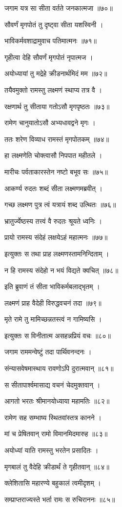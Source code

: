 जगाम यत्र सा सीता वर्तते जनकात्मजा ॥७०॥

सौवर्णं मृगपोतं तु दृष्ट्वा सीता यशस्विनी ।

भाविकर्मवशाद्रामुवाच पतिमात्मनः ॥७१॥

गृहीत्वा देहि सौवर्णं मृगपोतं नृपात्मज ।

अयोध्यायां तु मद्रेहे क्रीडनार्थमिदं मम ॥७२॥

तयैवमुक्तो रामस्तु लक्ष्मणं स्थाप्य तत्र वै ।

रक्षणार्थ तु सीताया गतोऽसौ मृगपृष्ठतः ॥७३॥

रामेण चानुयातोऽसौ अभ्यधावद्वने मृगः ।

ततः शरेण विव्याध रामस्तं मृगपोतकम् ॥७४॥

हा लक्ष्मणेति चोक्त्वासौ निपपात महीतले ।

मारीचः पर्वताकारस्तेन नष्टो बभूव सः ॥७५॥

आकर्ण्य रुदतः शब्दं सीता लक्ष्मणमब्रवीत् ।

गच्छ लक्ष्मण पुत्र त्वं यत्रायं शब्द उत्थितः ॥७६॥

भ्रातुर्ज्येष्ठस्य तत्त्वं वै रुदतः श्रूयते ध्वनिः ।

प्रायो रामस्य संदेहं लक्षयेऽहं महात्मनः ॥७७॥

इत्युक्तः स तथा प्राह लक्ष्मणस्तामनिन्दिताम् ।

न हि रामस्य संदेहो न भयं विद्यते क्वचित् ॥७८॥

इति ब्रुवाणं तं सीता भाविकर्मबलाद्भृतम् ।

लक्ष्मणं प्राह वैदेही विरुद्धवचनं तदा ॥७९॥

मृते रामे तु मामिच्छन्नतस्त्वं न गामिष्यसि ।

इत्युक्तः स विनीतात्म असहन्नप्रियं वचः ॥८०॥

जगाम राममन्वेष्टुं तदा पार्थिवनन्दनः ।

संन्यासवेषमास्थाय रावणोऽपि दुरात्मवान् ॥८१॥

स सीतापार्श्वमासाद्य वचनं चेदमुक्तवान् ।

आगतो भरतः श्रीमानयोध्याया महामतिः ॥८२॥

रामेण सह सम्भाष्य स्थितवांस्तत्र कानने ।

मां च प्रेषितवान् रामो विमानमिदमारुह ॥८३॥

अयोध्यां याति रामस्तु भरतेन प्रसादितः ।

मृगबालं तु वैदेहि क्रीडार्थं ते गृहीतवान् ॥८४॥

क्लेशितासि महारण्ये बहुकालं त्वमीदृशम् ।

सम्प्राप्तराज्यस्ते भर्ता रामः स रुचिराननः ॥८५॥

